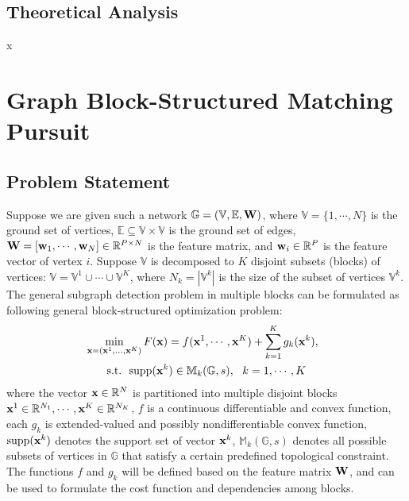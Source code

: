 \documentclass{article}
\begin{document}
\subsection{Theoretical Analysis}

x\cite{chen2017generic}


\section{Graph Block-Structured Matching Pursuit}

\subsection{Problem Statement}

Suppose we are given such a network $\mathbb{G} = (\mathbb{V}, \mathbb{E}, {\bf W})$, where $\mathbb{V} = \{1, \cdots, N\}$ is the ground set of vertices,  $\mathbb{E} \subseteq \mathbb{V}\times \mathbb{V}$ is the ground set of edges, ${\bf W} = [{\bf  w}_1, \cdots, {\bf w}_N]\in \mathbb{R}^{P\times N}$ is the feature matrix, and ${\bf w}_i\in \mathbb{R}^P$ is the feature vector of vertex $i$. Suppose $\mathbb{V}$ is decomposed to $K$ disjoint subsets (blocks) of vertices: $\mathbb{V} = \mathbb{V}^1\cup  \cdots \cup \mathbb{V}^K$, where $N_k = |\mathbb{V}^k|$ is the size of the subset of vertices $\mathbb{V}^k$.   
The general subgraph detection problem in multiple blocks can be formulated as following general block-structured optimization problem: 
\begin{equation}
\begin{gathered}
\min_{{\bf x}=({\bf x}^1,\dots,{\bf x}^K)} F({\bf x})=f({\bf x}^1, \cdots, {\bf x}^K) + \sum_{k=1}^K g_k({\bf x}^k), \ \  \\
\mathrm{s.t.}\ \ \mathrm{supp}({\bf x}^k) \in \mathbb{M}_k(\mathbb{G}, s),\ \  k = 1, \cdots, K \label{eq:gen_prob}    
\end{gathered}
\end{equation}
where the vector ${\bf x} \in \mathbb{R}^N$ is partitioned into multiple disjoint blocks ${\bf x}^1 \in \mathbb{R}^{N_1}, \cdots, {\bf x}^K \in \mathbb{R}^{N_K}$, $f$ is a continuous differentiable and convex function, each $g_k$ is extended-valued and possibly nondifferentiable convex function, $\text{supp}({\bf x}^k)$ denotes the support set of vector ${\bf x}^k$, $\mathbb{M}_k(\mathbb{G}, s)$
denotes all possible subsets of vertices in $\mathbb{G}$ that satisfy a certain predefined topological constraint. The functions $f$ and $g_k$ will be defined based on the feature matrix ${\bf W}$, and can be used to formulate the cost function and dependencies among blocks.
\end{document}
